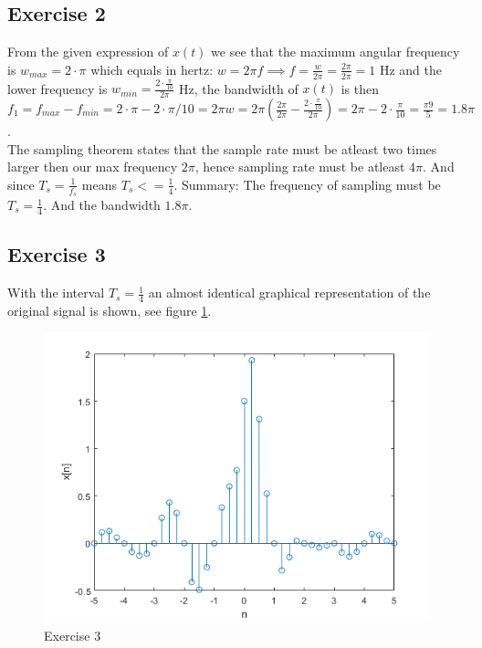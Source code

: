 \documentclass[a4paper]{article}
\begin{document}
\subsection{Exercise 2}
From the given expression of $x(t)$ we see that the maximum angular frequency is $w_{max} = 2\cdot\pi$ which equals in hertz: $w = 2\pi f \implies f = \frac{w}{2\pi} = \frac{2\pi}{2\pi} = 1$ Hz and the lower frequency is $w_{min} = \frac{2\cdot\frac{\pi}{10}}{2\pi} $ Hz, the bandwidth of $x(t)$ is then $f_1 = f_{max} - f_{min} = 2\cdot\pi-2\cdot\pi/10 = 2\pi w= 2\pi (\frac{2\pi}{2\pi} -\frac{2\cdot \frac{\pi}{10}}{2\pi})= 2\pi - 2\cdot\frac{\pi}{10} = \frac{\pi 9}{5} = 1.8\pi$. \\
The sampling theorem states that the sample rate must be atleast two times larger then our max frequency $2\pi$, hence sampling rate must be atleast $4\pi$. And since $T_s = \frac{1}{f_s}$ means $T_s <= \frac{1}{4}$.
Summary: The frequency of sampling must be $T_s = \frac{1}{4}$. And the bandwidth $1.8\pi$.
\subsection{Exercise 3}
With the interval $T_s = \frac{1}{4}$ an almost identical graphical representation of the original signal is shown, see figure \ref{fig:3}.
\begin{figure}
    \centering
    \includegraphics{3.png}
    \caption{Exercise 3}
    \label{fig:3}
\end{figure}
\end{document}
